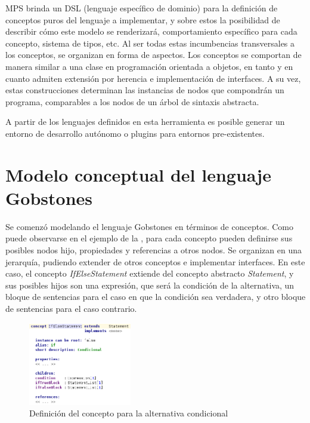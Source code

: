 MPS brinda un DSL (lenguaje específico de dominio) para la definición de conceptos puros del lenguaje a implementar, y sobre estos la posibilidad de describir cómo este modelo se renderizará, comportamiento específico para cada concepto, sistema de tipos, etc. Al ser todas estas incumbencias transversales a los conceptos, se organizan en forma de aspectos.
Los conceptos se comportan de manera similar a una clase en programación orientada a objetos, en tanto y en cuanto admiten extensión por herencia e implementación de interfaces. A su vez, estas construcciones determinan las instancias de nodos que compondrán un programa, comparables a los nodos de un árbol de sintaxis abstracta.

A partir de los lenguajes definidos en esta herramienta es posible generar un entorno de desarrollo autónomo o plugins para entornos pre-existentes.

\section{Modelo conceptual del lenguaje Gobstones}\label{dominio}

Se comenzó modelando el lenguaje Gobstones en términos de conceptos. Como puede observarse en el ejemplo de la , para cada concepto pueden definirse sus posibles nodos hijo, propiedades y referencias a otros nodos. Se organizan en una jerarquía, pudiendo extender de otros conceptos e implementar interfaces. En este caso, el concepto \textit{IfElseStatement} extiende del concepto abstracto \textit{Statement}, y sus posibles hijos son una expresión, que será la condición de la alternativa, un bloque de sentencias para el caso en que la condición sea verdadera, y otro bloque de sentencias para el caso contrario.

\begin{figure}[hb]
\centering
\includegraphics[width=0.4\textwidth]{assets/ifElse_concept}
\caption{Definición del concepto para la alternativa condicional}
\label{fig:ifElse_concept}
\end{figure}

